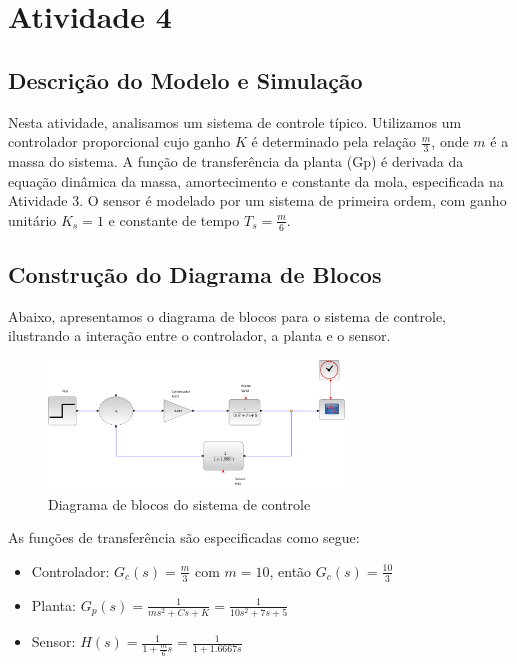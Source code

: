 \section{Atividade 4}

\subsection{Descrição do Modelo e Simulação}
Nesta atividade, analisamos um sistema de controle típico. Utilizamos um controlador proporcional cujo ganho \( K \) é determinado pela relação \( \frac{m}{3} \), onde \( m \) é a massa do sistema. A função de transferência da planta (Gp) é derivada da equação dinâmica da massa, amortecimento e constante da mola, especificada na Atividade 3. O sensor é modelado por um sistema de primeira ordem, com ganho unitário \( K_s = 1 \) e constante de tempo \( T_s = \frac{m}{6} \).

\subsection{Construção do Diagrama de Blocos}
Abaixo, apresentamos o diagrama de blocos para o sistema de controle, ilustrando a interação entre o controlador, a planta e o sensor.

\begin{figure}[H]
    \centering
    \includegraphics[width=0.7\textwidth]{atividades/4-atividade/assets/diagrama-blocos.png}
    \caption{Diagrama de blocos do sistema de controle}
    \label{fig:diagrama_blocos}
\end{figure}

As funções de transferência são especificadas como segue:
\begin{itemize}
    \item Controlador: \( G_c(s) = \frac{m}{3} \) com \( m = 10 \), então \( G_c(s) = \frac{10}{3} \)
    \item Planta: \( G_p(s) = \frac{1}{m s^2 + C s + K} = \frac{1}{10 s^2 + 7 s + 5} \)
    \item Sensor: \( H(s) = \frac{1}{1 + \frac{m}{6} s} = \frac{1}{1 + 1.6667 s} \)
\end{itemize}

